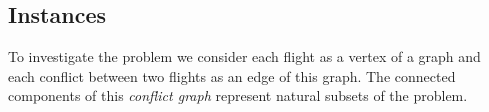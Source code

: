 \subsection{Instances}
To investigate the problem we consider each flight as a vertex of a graph and each conflict between two flights as an edge of this graph.
The connected components of this \emph{conflict graph} represent natural subsets of the problem.


